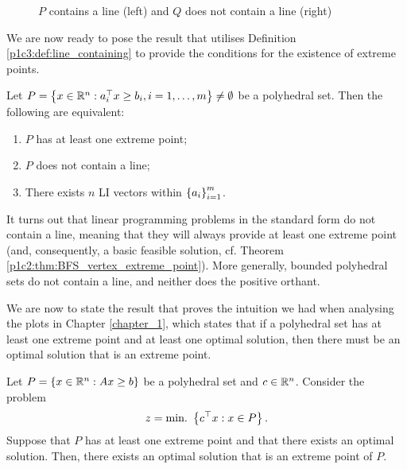 \begin{figure}[h]
	\caption{$P$ contains a line (left) and $Q$ does not contain a line (right)} \label{p1c3:fig:line_containing}	
\end{figure}

We are now ready to pose the result that utilises Definition \ref{p1c3:def:line_containing} to provide the conditions for the existence of extreme points.

\begin{theorem}\label{p1c3:thm:exist_extreme_point}
	Let $P = \left\{ x \in \mathbb{R}^n : a_i^\top x \geq b_i, i = 1, \dots, m \right \} \neq \emptyset$ be a polyhedral set. Then the following are equivalent:
	\begin{enumerate}
		\item $P$ has at least one extreme point;
		\item $P$ does not contain a line;
		\item There exists $n$ LI vectors within $\left\{ a_i \right \}_{i=1}^m$.	
	\end{enumerate}	
\end{theorem}	 


It turns out that linear programming problems in the standard form do not contain a line, meaning that they will always provide at least one extreme point (and, consequently, a basic feasible solution, cf. Theorem \ref{p1c2:thm:BFS_vertex_extreme_point}). More generally, bounded polyhedral sets do not contain a line, and neither does the positive orthant.

We are now to state the result that proves the intuition we had when analysing the plots in Chapter \ref{chapter_1}, which states that if a polyhedral set has at least one extreme point and at least one optimal solution, then there must be an optimal solution that is an extreme point.

\begin{theorem}\label{p1c3:thm:opt_extreme}
		Let $P = \left\{ x \in \mathbb{R}^n : Ax \geq b \right \}$ be a polyhedral set and $c \in \mathbb{R}^n$. Consider the problem 
			\begin{equation*}
		    		z = \mathop{\text{min.~}}\left\{ c^\top x : x \in P \right \}.					
			\end{equation*}
		Suppose that $P$ has at least one extreme point and that there exists an optimal solution. Then, there exists an optimal solution that is an extreme point of $P$.
\end{theorem}

